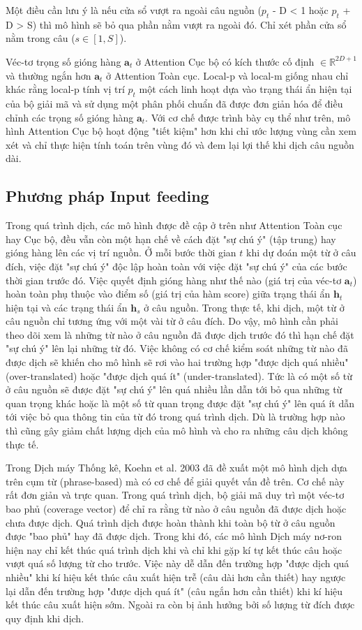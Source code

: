 Một điều cần lưu ý là nếu cửa sổ vượt ra ngoài câu nguồn ($p_t$ - D < 1 hoặc $p_t$ + D > S) thì mô hình sẽ bỏ qua phần nằm vượt ra ngoài đó. Chỉ xét phần cửa sổ nằm trong câu ($s \in [1, S]$).
 
Véc-tơ trọng số gióng hàng $\bm{a}_t$ ở Attention Cục bộ có kích thước cố định $\in \mathbb{R}^{2D + 1}$ và thường ngắn hơn $\bm{a}_t$ ở Attention Toàn cục. Local-p và local-m giống nhau chỉ khác rằng local-p tính vị trí $p_t$ một cách linh hoạt dựa vào trạng thái ẩn hiện tại của bộ giải mã và sử dụng một phân phối chuẩn đã được đơn giản hóa để điều chỉnh các trọng số gióng hàng $\bm{a}_t$. 
Với cơ chế được trình bày cụ thể như trên, mô hình Attention Cục bộ hoạt động "tiết kiệm" hơn khi chỉ ước lượng vùng cần xem xét và chỉ thực hiện tính toán trên vùng đó và đem lại lợi thế khi dịch câu nguồn dài.

\subsection{Phương pháp Input feeding}
Trong quá trình dịch, các mô hình được đề cập ở trên như Attention Toàn cục hay Cục bộ, đều vẫn còn một hạn chế về cách đặt "sự chú ý" (tập trung) hay gióng hàng lên các vị trí nguồn. Ở mỗi bước thời gian $t$ khi dự đoán một từ ở câu đích, việc đặt "sự chú ý" độc lập hoàn toàn với việc đặt "sự chú ý" của các bước thời gian trước đó. Việc quyết định gióng hàng như thế nào (giá trị của véc-tơ $\bm{a}_t$) hoàn toàn phụ thuộc vào điểm số (giá trị của hàm score) giữa trạng thái ẩn $\bm{h}_t$ hiện tại và các trạng thái ẩn $\bm{h}_s$ ở câu nguồn. Trong thực tế, khi dịch, một từ ở câu nguồn chỉ tương ứng với một vài từ ở câu đích. Do vậy, mô hình cần phải theo dõi xem là những từ nào ở câu nguồn đã được dịch trước đó thì hạn chế đặt "sự chú ý" lên lại những từ đó. Việc không có cơ chế kiểm soát những từ nào đã được dịch sẽ khiến cho mô hình sẽ rơi vào hai trường hợp "được dịch quá nhiều" (over-translated) hoặc "được dịch quá ít" (under-translated). Tức là có một số từ ở câu nguồn sẽ được đặt "sự chú ý" lên quá nhiều lần dẫn tới bỏ qua những từ quan trọng khác hoặc là một số từ quan trọng được đặt "sự chú ý" lên quá ít dẫn tới việc bỏ qua thông tin của từ đó trong quá trình dịch. Dù là trường hợp nào thì cũng gây giảm chất lượng dịch của mô hình và cho ra những câu dịch không thực tế.

Trong Dịch máy Thống kê, Koehn et al. 2003 \cite{smtKoehn2003} đã đề xuất một mô hình dịch dựa trên cụm từ (phrase-based) mà có cơ chế để giải quyết vấn đề trên. Cơ chế này rất đơn giản và trực quan. Trong quá trình dịch, bộ giải mã duy trì một véc-tơ bao phủ (coverage vector) để chỉ ra rằng từ nào ở câu nguồn đã được dịch hoặc chưa được dịch. Quá trình dịch được hoàn thành khi toàn bộ từ ở câu nguồn được "bao phủ" hay đã được dịch. Trong khi đó, các mô hình Dịch máy nơ-ron hiện nay chỉ kết thúc quá trình dịch khi và chỉ khi gặp kí tự kết thúc câu hoặc vượt quá số lượng từ cho trước. Việc này dễ dẫn đến trường hợp "được dịch quá nhiều" khi kí hiệu kết thúc câu xuất hiện trễ (câu dài hơn cần thiết) hay ngược lại dẫn đến trường hợp "được dịch quá ít" (câu ngắn hơn cần thiết) khi kí hiệu kết thúc câu xuất hiện sớm. Ngoài ra còn bị ảnh hưởng bởi số lượng từ đích được quy định khi dịch.

